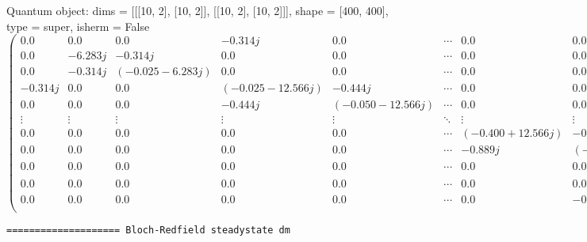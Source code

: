 \documentclass{article}
\begin{document}
    Quantum object: dims = [[[10, 2], [10, 2]], [[10, 2], [10, 2]]], shape = [400, 400], type = super, isherm = False\begin{equation*}\begin{pmatrix}0.0 & 0.0 & 0.0 & -0.314j & 0.0 & \cdots & 0.0 & 0.0 & 0.0 & 0.0 & 0.0\\0.0 & -6.283j & -0.314j & 0.0 & 0.0 & \cdots & 0.0 & 0.0 & 0.0 & 0.0 & 0.0\\0.0 & -0.314j & (-0.025-6.283j) & 0.0 & 0.0 & \cdots & 0.0 & 0.0 & 0.0 & 0.0 & 0.0\\-0.314j & 0.0 & 0.0 & (-0.025-12.566j) & -0.444j & \cdots & 0.0 & 0.0 & 0.0 & 0.0 & 0.0\\0.0 & 0.0 & 0.0 & -0.444j & (-0.050-12.566j) & \cdots & 0.0 & 0.0 & 0.0 & 0.0 & 0.0\\\vdots & \vdots & \vdots & \vdots & \vdots & \ddots & \vdots & \vdots & \vdots & \vdots & \vdots\\0.0 & 0.0 & 0.0 & 0.0 & 0.0 & \cdots & (-0.400+12.566j) & -0.889j & 0.0 & 0.0 & 0.0\\0.0 & 0.0 & 0.0 & 0.0 & 0.0 & \cdots & -0.889j & (-0.425+12.566j) & 0.0 & 0.0 & -0.942j\\0.0 & 0.0 & 0.0 & 0.0 & 0.0 & \cdots & 0.0 & 0.0 & (-0.425+6.283j) & -0.942j & 0.0\\0.0 & 0.0 & 0.0 & 0.0 & 0.0 & \cdots & 0.0 & 0.0 & -0.942j & (-0.450+6.283j) & 0.0\\0.0 & 0.0 & 0.0 & 0.0 & 0.0 & \cdots & 0.0 & -0.942j & 0.0 & 0.0 & -0.450\\\end{pmatrix}\end{equation*}

    
    \begin{Verbatim}[commandchars=\\\{\}]
==================== Bloch-Redfield steadystate dm
    \end{Verbatim}
\end{document}
